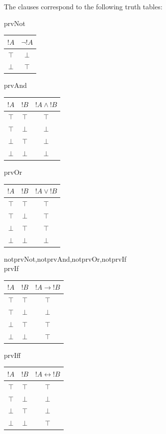 \documentclass[10pt,a4paper]{article}
\theoremstyle{plain}
\theoremstyle{definition}
\theoremstyle{remark}
\newenvironment{explain}{}{}
\providecommand{\lif}{\mathbin{\rightarrow}}
\providecommand{\True}{\top}
\providecommand{\False}{\bot}
\providecommand{\iftag}[1]{#1}
\providecommand{\liff}{\mathbin{\leftrightarrow}}
\providecommand{\iftag}{}
\begin{document}
\begin{explain}
The clauses correspond to the following truth tables:
\begin{center}
\iftag{prvNot}{
  \begin{tabular}{|c||c|} \hline
    $!A$ & $ \lnot !A$ \\
    \hline \hline
    $\True$ & $\False$ \\
    $\False$ & $\True$ \\
    \hline
  \end{tabular}
}{}
\iftag{prvAnd}{
  \begin{tabular}{|cc||c|} \hline
    $!A$ & $!B$ & $!A \land !B$ \\
    \hline \hline
    $\True$ & $\True$ & $\True$ \\
    $\True$ & $\False$ & $\False$ \\
    $\False$ & $\True$ & $\False$ \\
    $\False$ & $\False$ & $\False$ \\
    \hline
  \end{tabular}
}{}
\iftag{prvOr}{
  \begin{tabular}{|cc||c|} \hline
    $!A$ & $!B$ & $!A \lor !B$ \\
    \hline \hline
    $\True$ & $\True$ & $\True$ \\
    $\True$ & $\False$ & $\True$ \\
    $\False$ & $\True$ & $\True$ \\
    $\False$ & $\False$ & $\False$ \\
    \hline
  \end{tabular}
}{}%
\iftag{notprvNot,notprvAnd,notprvOr,notprvIf}{}{\\[1em]}
\iftag{prvIf}{
  \begin{tabular}{|cc||c|} \hline
    $!A$ & $!B$ & $!A \lif !B$ \\
    \hline \hline
    $\True$ & $\True$ & $\True$ \\
    $\True$ & $\False$ & $\False$ \\
    $\False$ & $\True$ & $\True$ \\
    $\False$ & $\False$ & $\True$ \\
    \hline
  \end{tabular}
}{}
\iftag{prvIff}{
  \begin{tabular}{|cc||c|} \hline
    $!A$ & $!B$ & $!A \liff !B$ \\
    \hline \hline
    $\True$ & $\True$ & $\True$ \\
    $\True$ & $\False$ & $\False$ \\
    $\False$ & $\True$ & $\False$ \\
    $\False$ & $\False$ & $\True$ \\
    \hline
  \end{tabular}
}{}
\end{center}
\end{explain}
\end{document}
